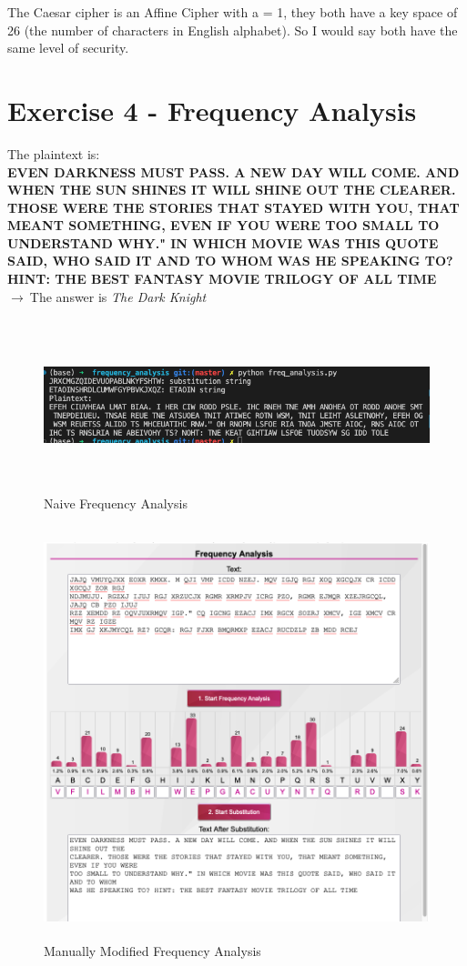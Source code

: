 \documentclass{article}
\begin{document}
The Caesar cipher is an Affine Cipher with a = 1, they both have a key space
of 26 (the number of characters in English alphabet). So I would say both have
the same level of security.

\section*{Exercise 4 - Frequency Analysis}
The plaintext is:\\
\textbf{EVEN DARKNESS MUST PASS. A NEW DAY WILL COME. AND WHEN THE SUN SHINES 
IT WILL SHINE OUT THE CLEARER. THOSE WERE THE STORIES THAT STAYED WITH YOU,
THAT MEANT SOMETHING, EVEN IF YOU WERE TOO SMALL TO UNDERSTAND WHY." IN WHICH
MOVIE WAS THIS QUOTE SAID, WHO SAID IT AND TO WHOM WAS HE SPEAKING TO? HINT:
THE BEST FANTASY MOVIE TRILOGY OF ALL TIME}\\
\(\rightarrow\ \)The answer is \emph{The Dark Knight}

\begin{figure}[htp]
    \centering
    \includegraphics[width=120mm, height=50mm]{naive_freq_analysis.png}
    \caption{Naive Frequency Analysis}
    \label{fig:naive_freq_analysis}
\end{figure}

\begin{figure}[htp]
    \centering
    \includegraphics[width=120mm, height=120mm]{modified_freq_analysis.png}
    \caption{Manually Modified Frequency Analysis}
    \label{fig:modified_freq_analysis}
\end{figure}
\end{document}
